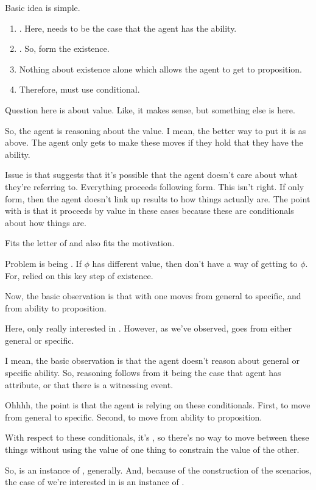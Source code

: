 \begin{note}
  Basic idea is simple.
  \begin{enumerate}
  \item {}.
    Here, needs to be the case that the agent has the ability.
  \item \nr{}.
    So, form the existence.
  \item Nothing about existence alone which allows the agent to get to proposition.
  \item Therefore, must use conditional.
  \end{enumerate}

  {
    \color{red}
    Question here is about value.
    Like, it makes sense, but something else is here.

    So, the agent is reasoning about the value.
    I mean, the better way to put it is as above.
    The agent only gets to make these moves if they hold that they have the ability.

    Issue is that \nr{} suggests that it's possible that the agent doesn't care about what they're referring to.
    Everything proceeds following form.
    This isn't right.
    If only form, then the agent doesn't link up results to how things actually are.
    The point with \nr{} is that it proceeds by value in these cases because these are conditionals about how things are.
  }

  Fits the letter of \nI{} and also fits the motivation.

  Problem is being \mom{}.
  If \(\phi\) has different value, then don't have a way of getting to \(\phi\).
  For, relied on this key step of existence.
\end{note}


\begin{note}
  Now, the basic observation is that with \nr{} one moves from general to specific, and from ability to proposition.

  Here, only really interested in .
  However, as we've observed, goes from either general or specific.

  I mean, the basic observation is that the agent doesn't reason about general or specific ability.
  So, reasoning follows from it being the case that agent has attribute, or that there is a witnessing event.

  Ohhhh, the point is that the agent is relying on these conditionals.
  First, to move from general to specific.
  Second, to move from ability to proposition.

  With respect to these conditionals, it's \nr{}, so there's no way to move between these things without using the value of one thing to constrain the value of the other.

  So, \RBV{} is an instance of \nr{}, generally.
  And, because of the construction of the scenarios, the case of \nr{} we're interested in is an instance of \RBV{}.
\end{note}

